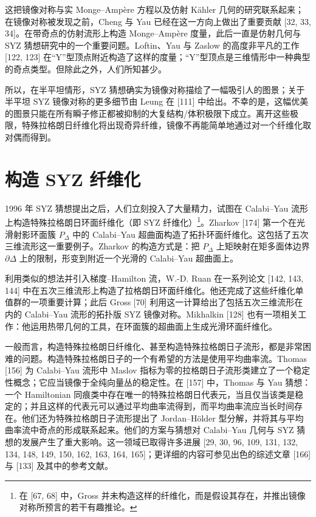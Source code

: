 这把镜像对称与实 Monge--Amp\`ere 方程以及仿射 K\"ahler 几何的研究联系起来；在镜像对称被发现之前，Cheng 与 Yau 已经在这一方向上做出了重要贡献 [32, 33, 34]。在带奇点的仿射流形上构造 Monge--Amp\`ere 度量，此后一直是仿射几何与 SYZ 猜想研究中的一个重要问题。Loftin、Yau 与 Zaslow 的高度非平凡的工作 [122, 123] 在“Y”型顶点附近构造了这样的度量；“Y”型顶点是三维情形中一种典型的奇点类型。但除此之外，人们所知甚少。

所以，在半平坦情形，SYZ 猜想确实为镜像对称描绘了一幅吸引人的图景；关于半平坦 SYZ 镜像对称的更多细节由 Leung 在 [111] 中给出。不幸的是，这幅优美的图景只能在所有瞬子修正都被抑制的大复结构/体积极限下成立。离开这些极限，特殊拉格朗日纤维化将出现奇异纤维，镜像不再能简单地通过对一个纤维化取对偶而得到。

\section{构造 SYZ 纤维化}
1996 年 SYZ 猜想提出之后，人们立刻投入了大量精力，试图在 Calabi--Yau 流形上构造特殊拉格朗日环面纤维化（即 SYZ 纤维化）\footnote{在 [67, 68] 中，Gross 并未构造这样的纤维化，而是假设其存在，并推出镜像对称所预言的若干有趣推论。}。Zharkov [174] 第一个在光滑射影环面簇 $P_\Delta$ 中的 Calabi--Yau 超曲面构造了拓扑环面纤维化。这包括了五次三维流形这一重要例子。Zharkov 的构造方式是：把 $P_\Delta$ 上矩映射在矩多面体边界 $\partial\Delta$ 上的限制，形变到附近一个光滑的 Calabi--Yau 超曲面上。

利用类似的想法并引入梯度--Hamilton 流，W.-D. Ruan 在一系列论文 [142, 143, 144] 中在五次三维流形上构造了拉格朗日环面纤维化。他还完成了这些纤维化单值群的一项重要计算；此后 Gross [70] 利用这一计算给出了包括五次三维流形在内的 Calabi--Yau 流形的拓扑版 SYZ 镜像对称。Mikhalkin [128] 也有一项相关工作：他运用热带几何的工具，在环面簇的超曲面上生成光滑环面纤维化。

一般而言，构造特殊拉格朗日纤维化、甚至构造特殊拉格朗日子流形，都是非常困难的问题。构造特殊拉格朗日子的一个有希望的方法是使用平均曲率流。Thomas [156] 为 Calabi--Yau 流形中 Maslov 指标为零的拉格朗日子流形类建立了一个稳定性概念；它应当镜像于全纯向量丛的稳定性。在 [157] 中，Thomas 与 Yau 猜想：一个 Hamiltonian 同痕类中存在唯一的特殊拉格朗日代表元，当且仅当该类是稳定的；并且这样的代表元可以通过平均曲率流得到，而平均曲率流应当长时间存在。他们还为特殊拉格朗日子流形提出了 Jordan--H\"older 型分解，并将其与平均曲率流中奇点的形成联系起来。他们的方案与猜想对 Calabi--Yau 几何与 SYZ 猜想的发展产生了重大影响。这一领域已取得许多进展 [29, 30, 96, 109, 131, 132, 134, 148, 149, 150, 162, 163, 164, 165]；更详细的内容可参见出色的综述文章 [166] 与 [133] 及其中的参考文献。
